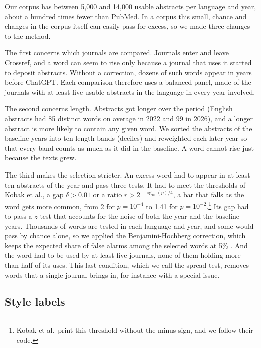\documentclass[12pt]{article}
\begin{document}
Our corpus has between 5,000 and 14,000 usable abstracts per language and year, about a hundred
times fewer than PubMed. In a corpus this small, chance and changes in the corpus itself can easily
pass for excess, so we made three changes to the method.

The first concerns which journals are compared. Journals enter and leave Crossref, and a word can
seem to rise only because a journal that uses it started to deposit abstracts. Without a
correction, dozens of such words appear in years before ChatGPT. Each comparison therefore uses a
balanced panel, made of the journals with at least five usable abstracts in the language in every
year involved.

The second concerns length. Abstracts got longer over the period (English abstracts had 85 distinct
words on average in 2022 and 99 in 2026), and a longer abstract is more likely to contain any given
word. We sorted the abstracts of the baseline years into ten length bands (deciles) and reweighted
each later year so that every band counts as much as it did in the baseline. A word cannot rise
just because the texts grew.

The third makes the selection stricter. An excess word had to appear in at least ten abstracts of
the year and pass three tests. It had to meet the thresholds of Kobak et al., a gap $\delta > 0.01$
or a ratio $r > 2^{-\log_{10}(p)/4}$, a bar that falls as the word gets more common, from 2 for
$p = 10^{-4}$ to 1.41 for $p = 10^{-2}$.\footnote{Kobak et al.\ print this threshold without the
minus sign, and we follow their code.} Its gap had to pass a $z$ test that accounts for the noise of
both the year and the baseline years. Thousands of words are tested in each language and year, and
some would pass by chance alone, so we applied the Benjamini-Hochberg correction, which keeps the
expected share of false alarms among the selected words at 5\% \cite{benjamini1995controlling}. And
the word had to be used by at least five journals, none of them holding more than half of its uses.
This last condition, which we call the spread test, removes words that a single journal brings in,
for instance with a special issue.

\subsection{Style labels}
\label{sec:labels}
\end{document}
